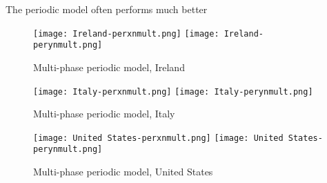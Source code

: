 The periodic model often performs much better

\begin{figure}[H]
  \texttt{[image: Ireland-perxnmult.png]} \label{fig:ireland-perxnmult}
\endminipage\hfill
{}
  \texttt{[image: Ireland-perynmult.png]} \label{fig:ireland-perynmult}
\endminipage
\caption{Multi-phase periodic model, Ireland}
\end{figure}

\begin{figure}[H]
  \texttt{[image: Italy-perxnmult.png]} \label{fig:italy-perxnmult}
\endminipage\hfill
{}
  \texttt{[image: Italy-perynmult.png]} \label{fig:italy-perynmult}
\endminipage
\caption{Multi-phase periodic model, Italy}
\end{figure}

\begin{figure}[H]
  \texttt{[image: United States-perxnmult.png]} \label{fig:usa-perxnmult}
\endminipage\hfill
{}
  \texttt{[image: United States-perynmult.png]} \label{fig:usa-perynmult}
\endminipage
\caption{Multi-phase periodic model, United States}
\end{figure}

